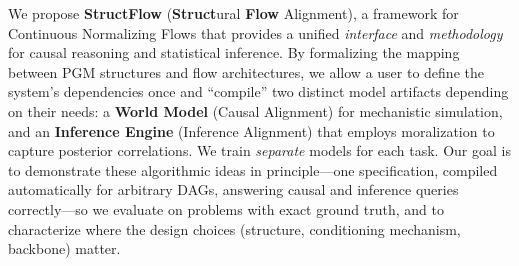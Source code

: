 We propose \textbf{StructFlow} (\textbf{Struct}ural \textbf{Flow} Alignment), a framework for Continuous Normalizing Flows that provides a unified \emph{interface} and \emph{methodology} for causal reasoning and statistical inference. By formalizing the mapping between PGM structures and flow architectures, we allow a user to define the system's dependencies once and ``compile'' two distinct model artifacts depending on their needs: a \textbf{World Model} (Causal Alignment) for mechanistic simulation, and an \textbf{Inference Engine} (Inference Alignment) that employs moralization to capture posterior correlations. We train \emph{separate} models for each task. Our goal is to demonstrate these algorithmic ideas in principle---one specification, compiled automatically for arbitrary DAGs, answering causal and inference queries correctly---so we evaluate on problems with exact ground truth, and to characterize where the design choices (structure, conditioning mechanism, backbone) matter.

